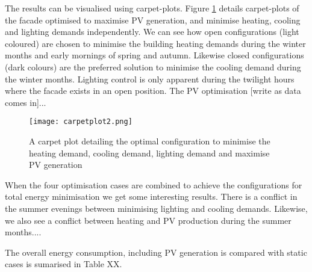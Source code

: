 


The results can be visualised using carpet-plots. Figure \ref{fig:carpetplot} details carpet-plots of the facade optimised to maximise PV generation, and minimise heating, cooling and lighting demands independently. We can see how open configurations (light coloured) are chosen to minimise the building heating demands during the winter months and early mornings of spring and autumn. Likewise closed configurations (dark colours) are the preferred solution to minimise the cooling demand during the winter months. Lighting control is only apparent during the twilight hours where the facade exists in an open position. The PV optimisation [write as data comes in]...

\begin{figure}
\begin{center}
\texttt{[image: carpetplot2.png]}
\caption{A carpet plot detailing the optimal configuration to minimise the heating demand, cooling demand, lighting demand and maximise PV generation}
\label{fig:carpetplot}
\end{center}
\end{figure}

When the four optimisation cases are combined to achieve the configurations for total energy minimisation we get some interesting results. There is a conflict in the summer evenings between minimising lighting and cooling demands. Likewise, we also see a conflict between heating and PV production during the summer months....

The overall energy consumption, including PV generation is compared with static cases is sumarised in Table XX. 
